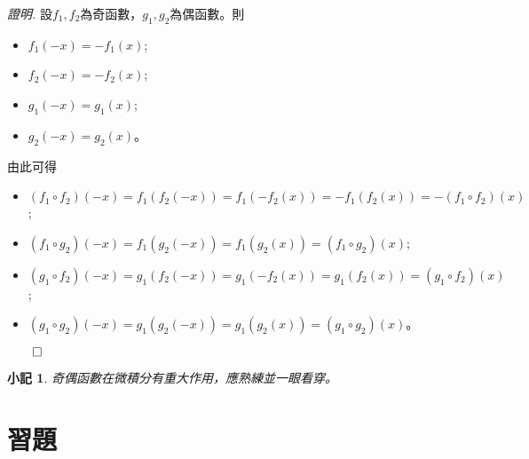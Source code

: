 \documentclass[12pt]{article}
\newtheorem*{remark}{小記}
\renewenvironment*{proof}{\textit{證明.}}{\hfill$\qed$}
\begin{document}
    \begin{proof}
        設$f_1,f_2$為奇函數，$g_1,g_2$為偶函數。則\begin{itemize}
            \item $f_1(-x)=-f_1(x)$;
            \item $f_2(-x)=-f_2(x)$;
            \item $g_1(-x)=g_1(x)$;
            \item $g_2(-x)=g_2(x)$。
        \end{itemize}
        由此可得\begin{itemize}
            \item $(f_1\circ f_2)(-x)=f_1(f_2(-x))=f_1(-f_2(x))=-f_1(f_2(x))=-(f_1\circ f_2)(x)$;
            \item $(f_1\circ g_2)(-x)=f_1(g_2(-x))=f_1(g_2(x))=(f_1\circ g_2)(x)$;
            \item $(g_1\circ f_2)(-x)=g_1(f_2(-x))=g_1(-f_2(x))=g_1(f_2(x))=(g_1\circ f_2)(x)$;
            \item $(g_1\circ g_2)(-x)=g_1(g_2(-x))=g_1(g_2(x))=(g_1\circ g_2)(x)$。
        \end{itemize}
    \end{proof}

    \begin{remark}
        奇偶函數在微積分有重大作用，應熟練並一眼看穿。
    \end{remark}

    \section*{習題}
\end{document}
